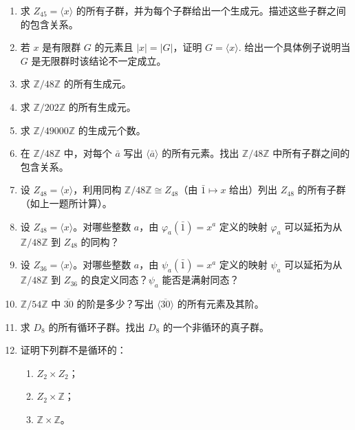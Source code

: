 \begin{enumerate}[label=\arabic*]
\item 求 \(Z_{45} = \langle x \rangle\) 的所有子群，并为每个子群给出一个生成元。描述这些子群之间的包含关系。

\item 若 \(x\) 是有限群 \(G\) 的元素且 \(|x| = |G|\)，证明 \(G = \langle x \rangle\). 给出一个具体例子说明当 \(G\) 是无限群时该结论不一定成立。

\item 求 \(\mathbb{Z}/48\mathbb{Z}\) 的所有生成元。

\item 求 \(\mathbb{Z}/202\mathbb{Z}\) 的所有生成元。

\item 求 \(\mathbb{Z}/49000\mathbb{Z}\) 的生成元个数。

\item 在 \(\mathbb{Z}/48\mathbb{Z}\) 中，对每个 \(\bar{a}\) 写出 \(\langle \bar{a} \rangle\) 的所有元素。找出 \(\mathbb{Z}/48\mathbb{Z}\) 中所有子群之间的包含关系。

\item 设 \(Z_{48} = \langle x \rangle\)，利用同构 \(\mathbb{Z}/48\mathbb{Z} \cong Z_{48}\)（由 \(\bar{1} \mapsto x\) 给出）列出 \(Z_{48}\) 的所有子群（如上一题所计算）。

\item 设 \(Z_{48} = \langle x \rangle\)。对哪些整数 \(a\)，由 \(\varphi_a(\bar{1}) = x^a\) 定义的映射 \(\varphi_a\) 可以延拓为从 \(\mathbb{Z}/48\mathbb{Z}\) 到 \(Z_{48}\) 的同构？

\item 设 \(Z_{36} = \langle x \rangle\)。对哪些整数 \(a\)，由 \(\psi_a(\bar{1}) = x^a\) 定义的映射 \(\psi_a\) 可以延拓为从 \(\mathbb{Z}/48\mathbb{Z}\) 到 \(Z_{36}\) 的良定义同态？\(\psi_a\) 能否是满射同态？

\item \(\mathbb{Z}/54\mathbb{Z}\) 中 \(\overline{30}\) 的阶是多少？写出 \(\langle \overline{30} \rangle\) 的所有元素及其阶。

\item 求 \(D_8\) 的所有循环子群。找出 \(D_8\) 的一个非循环的真子群。

\item 证明下列群不是循环的：
\begin{enumerate}[label=(\alph*)]
\item \(Z_2 \times Z_2\)；
\item \(Z_2 \times \mathbb{Z}\)；
\item \(\mathbb{Z} \times \mathbb{Z}\)。
\end{enumerate}


\end{enumerate}
